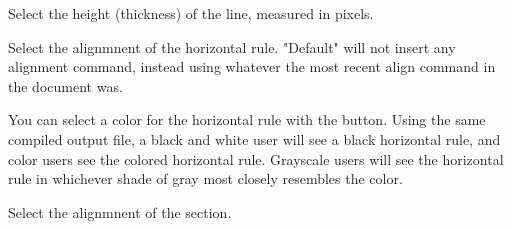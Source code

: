  Select the height (thickness) of the line, 
measured in pixels.
  
 Select the alignmnent of the horizontal 
rule. "Default" will not insert any alignment command, instead using whatever 
the most recent align command in the document was.
 
 You can select a color for the horizontal rule 
with the  button. Using the same compiled 
output file, a black and white user will see a black horizontal rule, and 
color users see the colored horizontal rule. Grayscale users will see the 
horizontal rule in whichever shade of gray most closely resembles the color.  



%
%


 Select the alignmnent of the section.


